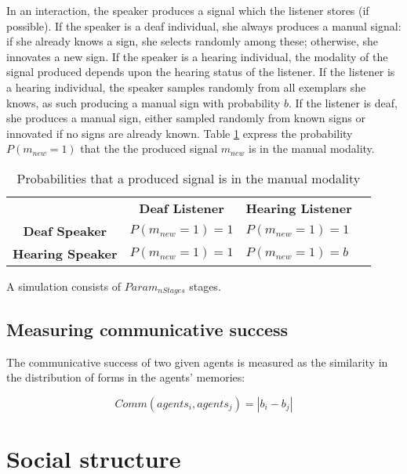 \documentclass[11pt, oneside]{article}
\begin{document}
In an interaction, the speaker produces a signal which the listener stores (if possible). If the speaker is a deaf individual, she always produces a manual signal: if she already knows a sign, she selects randomly among these; otherwise, she innovates a new sign. If the speaker is a hearing individual, the modality of the signal produced depends upon the hearing status of the listener. If the listener is a hearing individual, the speaker samples randomly from all exemplars she knows, as such producing a manual sign with probability $b$. If the listener is deaf, she produces a manual sign, either sampled randomly from known signs or innovated if no signs are already known. Table \ref{table:DND} express the probability $P(m_{new} = 1)$ that the the produced signal $m_{new}$ is in the manual modality.

\begin{table}[h]
\centering
\caption{Probabilities that a produced signal is in the manual modality}
\label{table:DND}
\begin{tabular}{clll}
\multicolumn{1}{l}{}     & \multicolumn{1}{c}{\textbf{Deaf Listener}} & \multicolumn{1}{c}{\textbf{Hearing Listener}} &  \\ \cline{1-3}
\textbf{Deaf Speaker}    & $P(m_{new}= 1) =1$                         & $P(m_{new}= 1) =1$                            &  \\
\textbf{Hearing Speaker} & $P(m_{new}= 1) =1$                         & $P(m_{new}= 1) =b$                            &
\end{tabular}
\end{table}

A simulation consists of $Param_{nStages}$ stages.

\subsection{Measuring communicative success}

The communicative success of two given agents is measured as the similarity in the distribution of forms in the agents' memories:

\begin{equation}
Comm(agents_i, agents_j) = | b_i - b_j |
\end{equation}

\section{Social structure}
\end{document}
